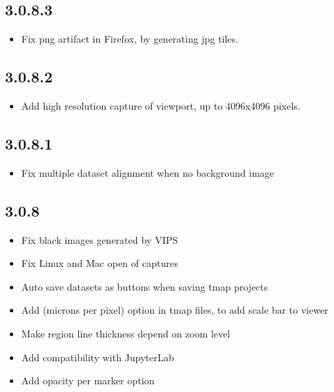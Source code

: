 \documentclass[letterpaper,10pt,english,openany,oneside]{sphinxmanual}
\begin{document}
\subsection{3.0.8.3}
\label{\detokenize{docs/intro/versions:id6}}\begin{itemize}
\item {} 
\sphinxAtStartPar
Fix png artifact in Firefox, by generating jpg tiles.

\end{itemize}


\subsection{3.0.8.2}
\label{\detokenize{docs/intro/versions:id7}}\begin{itemize}
\item {} 
\sphinxAtStartPar
Add high resolution capture of viewport, up to 4096x4096 pixels.

\end{itemize}


\subsection{3.0.8.1}
\label{\detokenize{docs/intro/versions:id8}}\begin{itemize}
\item {} 
\sphinxAtStartPar
Fix multiple dataset alignment when no background image

\end{itemize}


\subsection{3.0.8}
\label{\detokenize{docs/intro/versions:id9}}\begin{itemize}
\item {} 
\sphinxAtStartPar
Fix black images generated by VIPS

\item {} 
\sphinxAtStartPar
Fix Linux and Mac open of captures

\item {} 
\sphinxAtStartPar
Auto save datasets as buttons when saving tmap projects

\item {} 
\sphinxAtStartPar
Add  (microns per pixel) option in tmap files, to add scale bar to viewer

\item {} 
\sphinxAtStartPar
Make region line thickness depend on zoom level

\item {} 
\sphinxAtStartPar
Add compatibility with JupyterLab

\item {} 
\sphinxAtStartPar
Add opacity per marker option

\end{itemize}
\end{document}
